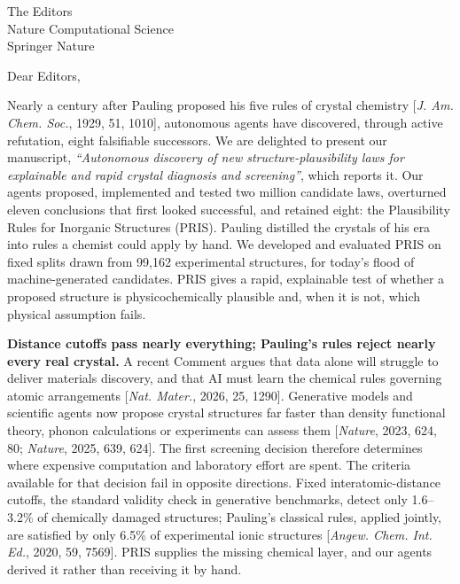 \documentclass[11pt,a4paper]{letter}
\date{\hfill August 24, 2026}
\begin{document}
\sloppy

\begin{letter}{The Editors\\Nature Computational Science\\Springer Nature}

\opening{Dear Editors,}

Nearly a century after Pauling proposed his five rules of crystal chemistry [\emph{J. Am. Chem. Soc.}, 1929, 51, 1010], autonomous agents have discovered, through active refutation, eight falsifiable successors. We are delighted to present our manuscript, \emph{``Autonomous discovery of new structure-plausibility laws for explainable and rapid crystal diagnosis and screening''}, which reports it. Our agents proposed, implemented and tested two million candidate laws, overturned eleven conclusions that first looked successful, and retained eight: the Plausibility Rules for Inorganic Structures (PRIS). Pauling distilled the crystals of his era into rules a chemist could apply by hand. We developed and evaluated PRIS on fixed splits drawn from 99{,}162 experimental structures, for today's flood of machine-generated candidates. PRIS gives a rapid, explainable test of whether a proposed structure is physicochemically plausible and, when it is not, which physical assumption fails.

\textbf{Distance cutoffs pass nearly everything; Pauling's rules reject nearly every real crystal.}
A recent Comment argues that data alone will struggle to deliver materials discovery, and that AI must learn the chemical rules governing atomic arrangements [\emph{Nat. Mater.}, 2026, 25, 1290]. Generative models and scientific agents now propose crystal structures far faster than density functional theory, phonon calculations or experiments can assess them [\emph{Nature}, 2023, 624, 80; \emph{Nature}, 2025, 639, 624]. The first screening decision therefore determines where expensive computation and laboratory effort are spent. The criteria available for that decision fail in opposite directions. Fixed interatomic-distance cutoffs, the standard validity check in generative benchmarks, detect only 1.6--3.2\% of chemically damaged structures; Pauling's classical rules, applied jointly, are satisfied by only 6.5\% of experimental ionic structures [\emph{Angew. Chem. Int. Ed.}, 2020, 59, 7569]. PRIS supplies the missing chemical layer, and our agents derived it rather than receiving it by hand.


\end{letter}
\end{document}
